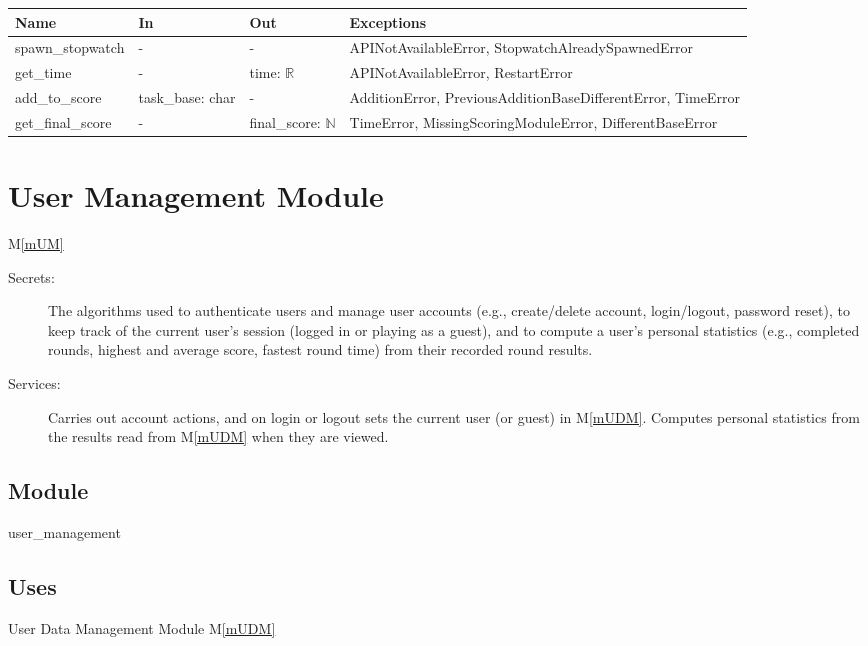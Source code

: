 \documentclass[12pt, titlepage]{article}
\newcommand{\mref}[1]{M\ref{#1}}
\begin{document}
\begin{center}
\begin{tabular}{p{4cm} p{4cm} p{4cm} p{4cm}}
\hline
\textbf{Name} & \textbf{In} & \textbf{Out} & \textbf{Exceptions} \\
\hline
spawn\_stopwatch & - & - & APINotAvailableError, StopwatchAlreadySpawnedError \\
get\_time & - & time: $\mathbb{R}$ & APINotAvailableError, RestartError \\
add\_to\_score & task\_base: char & - & AdditionError, PreviousAdditionBaseDifferentError, TimeError \\
get\_final\_score & - & final\_score: $\mathbb{N}$ & TimeError, MissingScoringModuleError, DifferentBaseError \\
\hline
\end{tabular}
\end{center}

\newpage

\section{User Management Module} \mref{mUM} 

\begin{description}
\item[Secrets:] The algorithms used to authenticate users and manage user accounts (e.g., create/delete account, login/logout, password reset), to keep track of the current user's session (logged in or playing as a guest), and to compute a user's personal statistics (e.g., completed rounds, highest and average score, fastest round time) from their recorded round results.
\item[Services:] Carries out account actions, and on login or logout sets the current user (or guest) in \mref{mUDM}. Computes personal statistics from the results read from \mref{mUDM} when they are viewed.
\end{description}

\subsection{Module}

user\_management

\subsection{Uses}

User Data Management Module \mref{mUDM}
\end{document}
